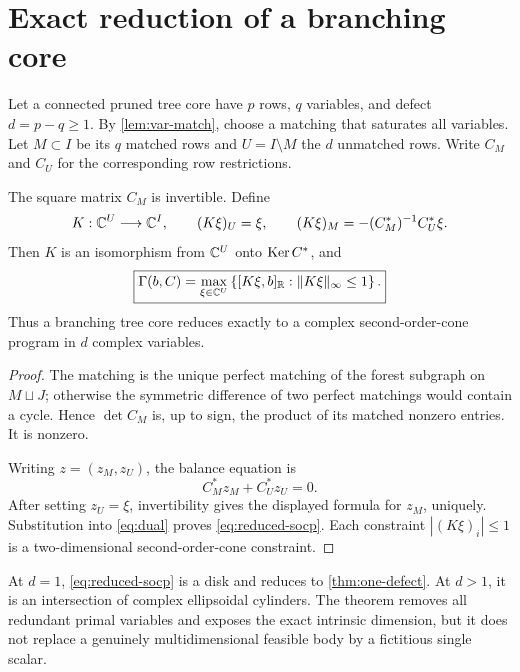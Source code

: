 \section{Exact reduction of a branching core}
\label{sec:higher-defect}

Let a connected pruned tree core have \(p\) rows, \(q\) variables, and
defect \(d=p-q\ge1\).  By \cref{lem:var-match}, choose a matching that
saturates all variables.  Let \(M\subset I\) be its \(q\) matched rows
and \(U=I\setminus M\) the \(d\) unmatched rows.  Write \(C_M\) and
\(C_U\) for the corresponding row restrictions.

\begin{theorem}\label{thm:reduced-socp}
The square matrix \(C_M\) is invertible.  Define
\[
 K:\mathbb C^U\longrightarrow\mathbb C^I,
 \qquad
 (K\xi)_U=\xi,
 \qquad
 (K\xi)_M=-(C_M^*)^{-1}C_U^*\xi.
\]
Then \(K\) is an isomorphism from \(\mathbb C^U\) onto \(\operatorname{Ker} C^*\), and
\begin{equation}\label{eq:reduced-socp}
 \boxed{\displaystyle
 \Gamma(b,C)
 =
 \max_{\xi\in\mathbb C^U}
 \left\{
 [K\xi,b]_{\mathbb R}:\|K\xi\|_\infty\le1
 \right\}.}
\end{equation}
Thus a branching tree core reduces exactly to a complex
second-order-cone program in \(d\) complex variables.
\end{theorem}

\begin{proof}
The matching is the unique perfect matching of the forest subgraph on
\(M\sqcup J\); otherwise the symmetric difference of two perfect
matchings would contain a cycle.  Hence
\(\det C_M\) is, up to sign, the product of its matched nonzero entries.
It is nonzero.

Writing \(z=(z_M,z_U)\), the balance equation is
\[
 C_M^*z_M+C_U^*z_U=0.
\]
After setting \(z_U=\xi\), invertibility gives the displayed formula
for \(z_M\), uniquely.  Substitution into \eqref{eq:dual} proves
\eqref{eq:reduced-socp}.  Each constraint
\(|(K\xi)_i|\le1\) is a two-dimensional second-order-cone constraint.
\end{proof}

\begin{remark}
At \(d=1\), \eqref{eq:reduced-socp} is a disk and reduces to
\cref{thm:one-defect}.  At \(d>1\), it is an intersection of complex
ellipsoidal cylinders.  The theorem removes all redundant primal
variables and exposes the exact intrinsic dimension, but it does not
replace a genuinely multidimensional feasible body by a fictitious
single scalar.
\end{remark}

